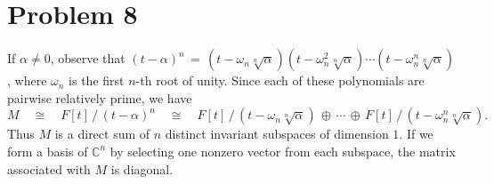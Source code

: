 \documentclass[11pt]{article}
\begin{document}
\section{Problem 8}

If $\alpha \ne 0$, observe that $(t - \alpha)^{n} \, = \, (t - \omega_{n}\sqrt[n]{\alpha})(t - \omega_{n}^{2}\sqrt[n]{\alpha}) \cdots (t - \omega_{n}^{n}\sqrt[n]{\alpha})$, where $\omega_{n}$ is the first $n$-th root of unity. Since each of these polynomials are pairwise relatively prime, we have
\[
  M \quad \cong \quad F[t] \, / \, (t - \alpha)^{n} \quad \cong \quad F[t] \, / \, (t - \omega_{n}\sqrt[n]{\alpha}) \, \oplus \, \cdots \, \oplus \, F[t] \, / \, (t - \omega_{n}^{n}\sqrt[n]{\alpha}).
\]
Thus $M$ is a direct sum of $n$ distinct invariant subspaces of dimension $1$. If we form a basis of $\mathbb{C}^{n}$ by selecting one nonzero vector from each subspace, the matrix associated with $M$ is diagonal.

\end{document}

